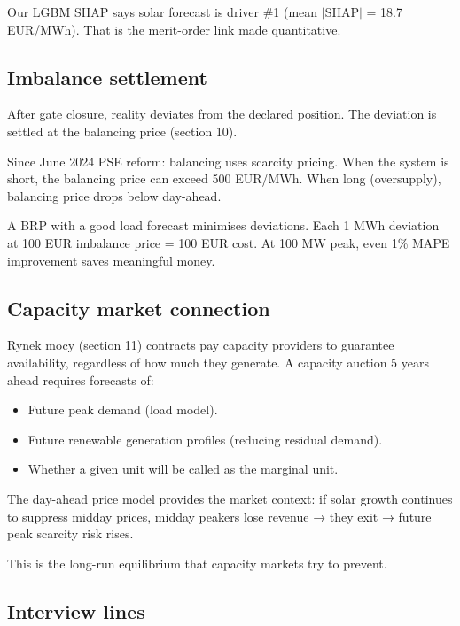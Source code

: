 Our LGBM SHAP says solar forecast is driver \#1 (mean $|\text{SHAP}|$ = 18.7 EUR/MWh).
That is the merit-order link made quantitative.

\subsection{Imbalance settlement}

After gate closure, reality deviates from the declared position.
The deviation is settled at the balancing price (section 10).

Since June 2024 PSE reform: balancing uses scarcity pricing.
When the system is short, the balancing price can exceed 500 EUR/MWh.
When long (oversupply), balancing price drops below day-ahead.

A BRP with a good load forecast minimises deviations.
Each 1 MWh deviation at 100 EUR imbalance price = 100 EUR cost.
At 100 MW peak, even 1\% MAPE improvement saves meaningful money.

\subsection{Capacity market connection}

Rynek mocy (section 11) contracts pay capacity providers
to guarantee availability, regardless of how much they generate.
A capacity auction 5 years ahead requires forecasts of:

\begin{itemize}
  \item Future peak demand (load model).
  \item Future renewable generation profiles (reducing residual demand).
  \item Whether a given unit will be called as the marginal unit.
\end{itemize}

The day-ahead price model provides the market context:
if solar growth continues to suppress midday prices,
midday peakers lose revenue → they exit → future peak scarcity risk rises.

This is the long-run equilibrium that capacity markets try to prevent.

\subsection{Interview lines}

